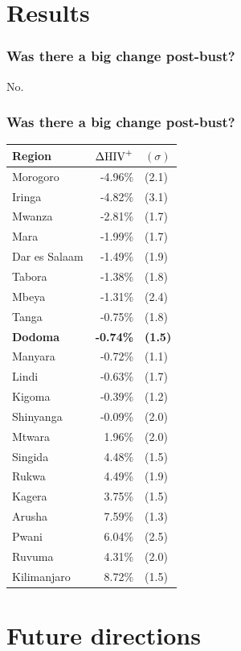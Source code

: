 \documentclass[11pt,final,hyperref={pdfpagelabels=false},xcolor=dvipsnames]{beamer}
\begin{document}
\section{Results}

\begin{frame}[fragile]\frametitle{Was there a big change post-bust?}

    No.
\end{frame}

\begin{frame}[fragile]\frametitle{Was there a big change post-bust?}
\begin{center}
{\footnotesize
    \begin{tabular}{lrl}
        Region & $\Delta {\rm HIV}^+$ &$(\sigma)$ \\\hline
Morogoro  & -4.96\%  &  (2.1) \\
Iringa  & -4.82\%  &  (3.1) \\
Mwanza  & -2.81\%  &  (1.7) \\
Mara  & -1.99\%  &  (1.7) \\
Dar es Salaam  & -1.49\%  &  (1.9) \\
Tabora  & -1.38\%  &  (1.8) \\
Mbeya  & -1.31\%  &  (2.4) \\
Tanga  & -0.75\%  &  (1.8) \\
{\bf Dodoma}  & {\bf -0.74\%}  &  {\bf (1.5)} \\
Manyara  & -0.72\%  &  (1.1) \\
Lindi  & -0.63\%  &  (1.7) \\
Kigoma  & -0.39\%  &  (1.2) \\
Shinyanga  & -0.09\%  &  (2.0) \\
Mtwara  & 1.96\%  &  (2.0) \\
Singida  & 4.48\%  &  (1.5) \\
Rukwa  & 4.49\%  &  (1.9) \\
Kagera  & 3.75\%  &  (1.5) \\
Arusha  & 7.59\%  &  (1.3) \\
Pwani  & 6.04\%  &  (2.5) \\
Ruvuma  & 4.31\%  &  (2.0) \\
Kilimanjaro  & 8.72\%  &  (1.5) \\
\end{tabular}
}
\end{center}

\end{frame}


\section{Future directions}
\end{document}
